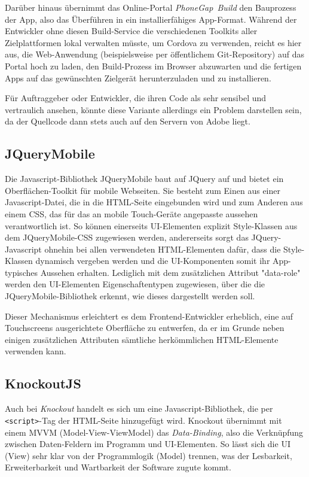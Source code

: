 \documentclass[bibtotoc]{scrreprt}
\begin{document}
Darüber hinaus übernimmt das Online-Portal \emph{PhoneGap~Build} den Bauprozess der App, also das Überführen in ein installierfähiges App-Format. 
Während der Entwickler ohne diesen Build-Service die verschiedenen Toolkits aller Zielplattformen lokal verwalten müsste, um Cordova zu verwenden,\cite{www1} reicht es hier aus, die Web-Anwendung (beispielsweise per öffentlichem Git-Repository) auf das Portal hoch zu laden, den Build-Prozess im Browser abzuwarten und die fertigen Apps auf das gewünschten Zielgerät herunterzuladen und zu installieren. 

Für Auftraggeber oder Entwickler, die ihren Code als sehr sensibel und vertraulich ansehen, könnte diese Variante allerdings ein Problem darstellen sein, da der Quellcode dann stets auch auf den Servern von Adobe liegt.

\subsection{JQueryMobile}
Die Javascript-Bibliothek JQueryMobile baut auf JQuery auf und bietet ein Oberflächen-Toolkit für mobile Webseiten. Sie besteht zum Einen aus einer Javascript-Datei, die in die HTML-Seite eingebunden wird und zum Anderen aus einem CSS, das für das an mobile Touch-Geräte angepasste aussehen verantwortlich ist. 
So können einerseits UI-Elementen explizit Style-Klassen aus dem JQueryMobile-CSS zugewiesen werden, andererseits sorgt das JQuery-Javascript ohnehin bei allen verwendeten HTML-Elementen dafür, dass die Style-Klassen dynamisch vergeben werden und die UI-Komponenten somit ihr App-typisches Aussehen erhalten.
Lediglich mit dem zusätzlichen Attribut "data-role" werden den UI-Elementen Eigenschaftentypen zugewiesen, über die die JQueryMobile-Bibliothek erkennt, wie dieses dargestellt werden soll.

Dieser Mechanismus erleichtert es dem Frontend-Entwickler erheblich, eine auf Touchscreens ausgerichtete Oberfläche zu entwerfen, da er im Grunde neben einigen zusätzlichen Attributen sämtliche herkömmlichen HTML-Elemente verwenden kann. 

\subsection{KnockoutJS}
Auch bei \emph{Knockout} handelt es sich um eine Javascript-Bibliothek, die per \mbox{\texttt{<script>}-Tag} der HTML-Seite hinzugefügt wird. Knockout übernimmt mit einem MVVM (Model-View-ViewModel) das \emph{Data-Binding}, also die Verknüpfung zwischen Daten-Feldern im Programm und UI-Elementen.
So lässt sich die UI (View) sehr klar von der Programmlogik (Model) trennen, was der Lesbarkeit, Erweiterbarkeit und Wartbarkeit der Software zugute kommt.
\end{document}
